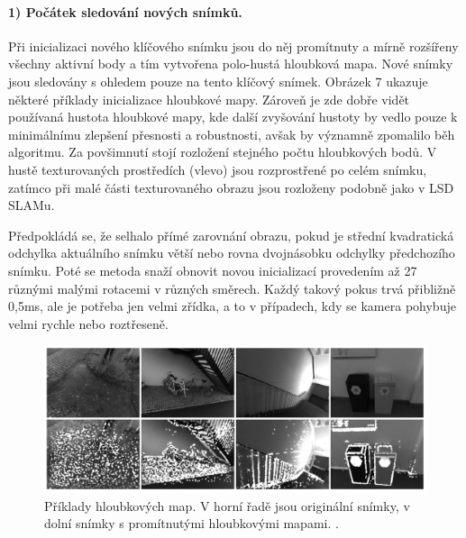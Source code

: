 \documentclass[12pt,a4paper]{report}
\begin{document}
\paragraph*{1) Počátek sledování nových snímků.} Při inicializaci nového klíčového snímku jsou do něj promítnuty a mírně rozšířeny všechny aktivní body a tím vytvořena polo-hustá hloubková mapa. Nové snímky jsou sledovány s ohledem pouze na tento klíčový snímek. Obrázek 7 ukazuje některé příklady inicializace hloubkové mapy. Zároveň je zde dobře vidět používaná hustota hloubkové mapy, kde další zvyšování hustoty by vedlo pouze k minimálnímu zlepšení přesnosti a robustnosti, avšak by významně zpomalilo běh algoritmu. Za povšimnutí stojí rozložení stejného počtu hloubkových bodů. V hustě texturovaných prostředích (vlevo) jsou rozprostřené po celém snímku, zatímco při malé části texturovaného obrazu jsou rozloženy podobně jako v LSD SLAMu.

Předpokládá se, že selhalo přímé zarovnání obrazu, pokud je střední kvadratická odchylka aktuálního snímku větší nebo rovna dvojnásobku odchylky předchozího snímku. Poté se metoda snaží obnovit novou inicializací provedením až 27 různými malými rotacemi v různých směrech. Každý takový pokus trvá přibližně 0,5ms, ale je potřeba jen velmi zřídka, a to v případech, kdy se kamera pohybuje velmi rychle nebo roztřeseně.

\begin{figure}[H]
\centering
\includegraphics[scale=0.64]{img/Obr5_b.png}
\caption{Příklady hloubkových map. V horní řadě jsou originální snímky, v dolní snímky s promítnutými hloubkovými mapami.  \cite{Engel2018_DSO}.}
\end{figure}
\end{document}
